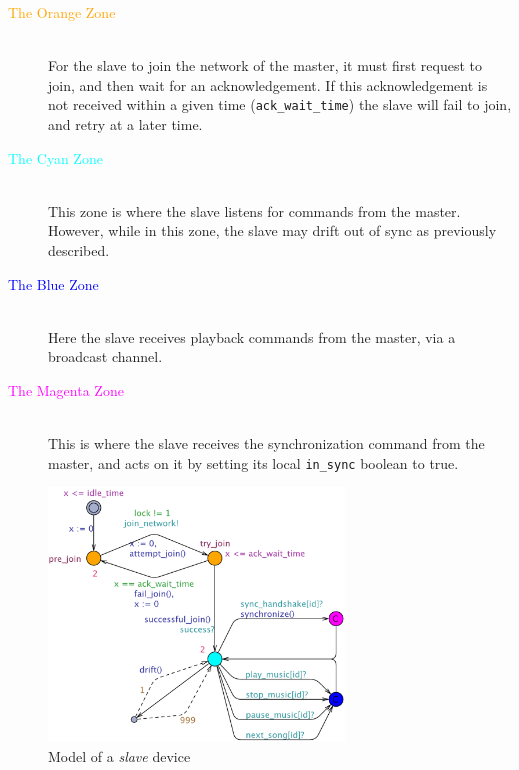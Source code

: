 \begin{description}
    \item[\textcolor{orange}{The Orange Zone}] \hfill\\
        For the slave to join the network of the master, it must first request to join, and then wait for an acknowledgement.
        If this acknowledgement is not received within a given time (\texttt{ack\_wait\_time}) the slave will fail to join, and retry at a later time.
    \item[\textcolor{cyan}{The Cyan Zone}] \hfill\\
        This zone is where the slave listens for commands from the master.
        However, while in this zone, the slave may drift out of sync as previously described.
    \item[\textcolor{blue}{The Blue Zone}] \hfill\\
        Here the slave receives playback commands from the master, via a broadcast channel.
    \item[\textcolor{magenta}{The Magenta Zone}] \hfill\\
        This is where the slave receives the synchronization command from the master, and acts on it by setting its local \texttt{in\_sync} boolean to true.
\end{description}

\begin{figure}[htb]
    \centering
    \includegraphics[width=0.7\textwidth]{slave_model.pdf}
    \caption{Model of a \textit{slave} device}\label{fig:slave_model}
\end{figure}

